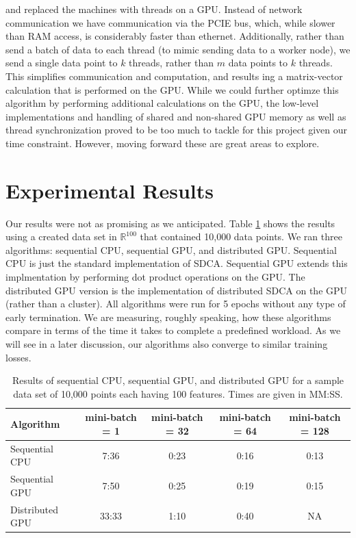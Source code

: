 \documentclass{article}
\def \R {\mathbb{R}}
\def \R {\mathbb{R}}
\begin{document}
and replaced the machines with threads on a GPU. Instead of network
communication we have communication via the PCIE bus, which, while slower than
RAM access, is considerably faster than ethernet. Additionally, rather than send
a batch of data to each thread (to mimic sending data to a worker node), we send
a single data point to $k$ threads, rather than $m$ data points to $k$ threads.
This simplifies communication and computation, and results ing a matrix-vector
calculation that is performed on the GPU. While we could further optimze this
algorithm by performing additional calculations on the GPU, the low-level
implementations and handling of shared and non-shared GPU memory as well as
thread synchronization proved to be too much to tackle for this project given
our time constraint. However, moving forward these are great areas to explore.

\section{Experimental Results}
Our results were not as promising as we anticipated. Table \ref{tab:res-scale}
shows the results using a created data set in $\R^{100}$ that contained 10,000
data points. We ran three algorithms: sequential CPU, sequential GPU, and
distributed GPU. Sequential CPU is just the standard implementation of SDCA.
Sequential GPU extends this implmentation by performing dot product operations
on the GPU. The distributed GPU version is the implementation of distributed
SDCA on the GPU (rather than a cluster). All algorithms were run for 5 epochs
without any type of early termination. We are measuring, roughly speaking, how
these algorithms compare in terms of the time it takes to complete a predefined
workload. As we will see in a later discussion, our algorithms also converge to
similar training losses.

\begin{table}
  \centering
  \caption{Results of sequential CPU, sequential GPU, and distributed GPU
    for a sample data set of 10,000 points each having 100 features. Times are
    given in MM:SS.}
  \label{tab:res-scale}
  \begin{tabular}{l|cccc}
      \textbf{Algorithm} & \textbf{mini-batch = 1} & \textbf{mini-batch = 32} &
      \textbf{mini-batch = 64} & \textbf{mini-batch = 128}\\\hline
      Sequential CPU & 7:36 & 0:23 & 0:16 & 0:13\\
      Sequential GPU & 7:50 & 0:25 & 0:19 & 0:15\\
      Distributed GPU & 33:33 & 1:10 & 0:40 & NA\\\hline
  \end{tabular}
\end{table}
\end{document}
